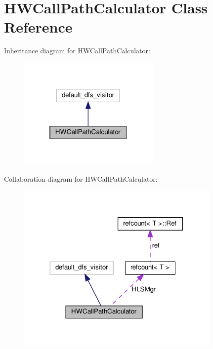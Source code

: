 \hypertarget{classHWCallPathCalculator}{}\section{H\+W\+Call\+Path\+Calculator Class Reference}
\label{classHWCallPathCalculator}


Inheritance diagram for H\+W\+Call\+Path\+Calculator\+:
\nopagebreak
\begin{figure}[H]
\begin{center}
\leavevmode
\includegraphics[width=196pt]{dc/dbd/classHWCallPathCalculator__inherit__graph}
\end{center}
\end{figure}


Collaboration diagram for H\+W\+Call\+Path\+Calculator\+:
\nopagebreak
\begin{figure}[H]
\begin{center}
\leavevmode
\includegraphics[width=281pt]{d2/d1b/classHWCallPathCalculator__coll__graph}
\end{center}
\end{figure}
